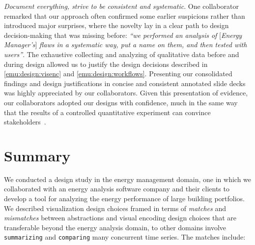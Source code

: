  {\it Document everything, strive to be consistent and systematic}. 
One collaborator remarked that our approach often confirmed some earlier suspicions rather than introduced major surprises, where the novelty lay in a clear path to design decision-making that was missing before: {\it ``we performed an analysis of} [{\it Energy Manager's}] {\it flaws in a systematic way, put a name on them, and then tested with users''}. 
The exhaustive collecting and analyzing of qualitative data before and during design allowed us to justify the design decisions described in \autoref{emu:design:visenc} and \autoref{emu:design:workflows}. 
Presenting our consolidated findings and design justifications in concise and consistent annotated slide decks was highly appreciated by our collaborators.
Given this presentation of evidence, our collaborators adopted our designs with confidence, much in the same way that the results of a controlled quantitative experiment can convince stakeholders~\cite{Sedlmair2011}. 


\section{Summary}
\label{emu:conclusion}


We conducted a design study in the energy management domain, one in which we collaborated with an energy analysis software company and their clients to develop a tool for analyzing the energy performance of large building portfolios.
We described visualization design choices framed in terms of {\it matches} and {\it mismatches} between abstractions and visual encoding design choices that are transferable beyond the energy analysis domain, to other domains involve {\tt summarizing} and {\tt comparing} many concurrent time series.
The matches include: 

